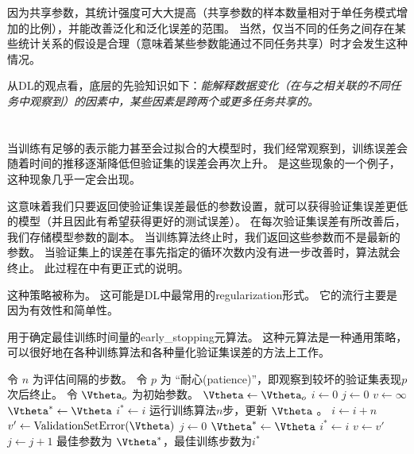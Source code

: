因为共享参数，其统计强度可大大提高（共享参数的样本数量相对于单任务模式增加的比例），并能改善泛化和泛化误差的范围\citep{Baxter-1995}。
当然，仅当不同的任务之间存在某些统计关系的假设是合理（意味着某些参数能通过不同任务共享）时才会发生这种情况。

从\gls{DL}的观点看，底层的先验知识如下：\emph{能解释数据变化（在与之相关联的不同任务中观察到）的因素中，某些因素是跨两个或更多任务共享的。}


\section{}
\label{sec:early_stopping}
当训练有足够的表示能力甚至会过拟合的大模型时，我们经常观察到，训练误差会随着时间的推移逐渐降低但验证集的误差会再次上升。
是这些现象的一个例子，这种现象几乎一定会出现。


这意味着我们只要返回使验证集误差最低的参数设置，就可以获得验证集误差更低的模型（并且因此有希望获得更好的测试误差）。
在每次验证集误差有所改善后，我们存储模型参数的副本。
当训练算法终止时，我们返回这些参数而不是最新的参数。
当验证集上的误差在事先指定的循环次数内没有进一步改善时，算法就会终止。
此过程在中有更正式的说明。



这种策略被称为。
这可能是\gls{DL}中最常用的\gls{regularization}形式。
它的流行主要是因为有效性和简单性。

\begin{algorithm}[ht]
\caption{用于确定最佳训练时间量的\gls{early_stopping}元算法。
这种元算法是一种通用策略，可以很好地在各种训练算法和各种量化验证集误差的方法上工作。
}
\label{alg:early_stopping}
\begin{algorithmic}
\STATE 令 $n$ 为评估间隔的步数。
\STATE 令 $p$ 为 ``耐心(patience)''，即观察到较坏的验证集表现$p$次后终止。 
\STATE 令 $\Vtheta_{o}$ 为初始参数。
\STATE $\Vtheta \leftarrow \Vtheta_{o}$
\STATE $i \leftarrow 0$
\STATE $j \leftarrow 0$
\STATE $v \leftarrow \infty$
\STATE $\Vtheta^* \leftarrow \Vtheta$
\STATE $i^* \leftarrow i$
    \STATE 运行训练算法$n$步，更新 $\Vtheta$ 。
    \STATE $i \leftarrow i + n$
    \STATE $v' \leftarrow \text{ValidationSetError}(\Vtheta)$
        \STATE $j \leftarrow 0$
        \STATE $\Vtheta^* \leftarrow \Vtheta$
        \STATE $i^* \leftarrow i$
        \STATE $v \leftarrow v'$
    \ELSE
        \STATE $j \leftarrow j + 1$
    \ENDIF
\ENDWHILE
\STATE 最佳参数为 $\Vtheta^*$，最佳训练步数为$i^*$
\end{algorithmic}
\end{algorithm}


